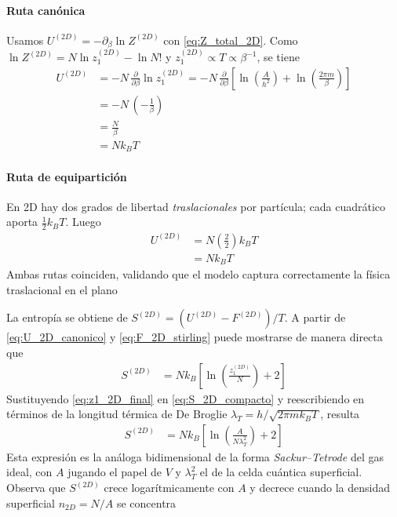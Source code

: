 \documentclass{article}
\begin{document}
\paragraph{Ruta canónica} Usamos $U^{(2D)}=-\partial_{\beta}\ln Z^{(2D)}$ con \eqref{eq:Z_total_2D}. Como $\ln Z^{(2D)}=N\ln z_1^{(2D)}-\ln N!$ y $z_1^{(2D)}\propto T\propto \beta^{-1}$, se tiene
\begin{equation}
\begin{split}
U^{(2D)}
&= -N\,\frac{\partial}{\partial \beta}\ln z_1^{(2D)}
= -N\,\frac{\partial}{\partial \beta}\left[\ln\!\left(\frac{A}{h^2}\right)+\ln\!\left(\frac{2\pi m}{\beta}\right)\right]\\
&= -N\,\left(-\frac{1}{\beta}\right)\\
&= \frac{N}{\beta}\\
&= N k_B T
\end{split}\label{eq:U_2D_canonico}
\end{equation}

\paragraph{Ruta de equipartición} En 2D hay dos grados de libertad \textit{traslacionales} por partícula; cada cuadrático aporta $\tfrac{1}{2}k_B T$. Luego
\begin{equation}
\begin{split}
U^{(2D)}
&= N\left(\frac{2}{2}\right)k_B T\\
&= N k_B T
\end{split}\label{eq:U_2D_equiparticion}
\end{equation}
Ambas rutas coinciden, validando que el modelo captura correctamente la física traslacional en el plano



La entropía se obtiene de $S^{(2D)}=(U^{(2D)}-F^{(2D)})/T$. A partir de \eqref{eq:U_2D_canonico} y \eqref{eq:F_2D_stirling} puede mostrarse de manera directa que
\begin{equation}
\begin{split}
S^{(2D)}
&= N k_B\left[\ln\!\left(\frac{z_1^{(2D)}}{N}\right)+2\right]
\end{split}\label{eq:S_2D_compacto}
\end{equation}
Sustituyendo \eqref{eq:z1_2D_final} en \eqref{eq:S_2D_compacto} y reescribiendo en términos de la longitud térmica de De Broglie $\lambda_T = h/\sqrt{2\pi m k_B T}$, resulta
\begin{equation}
\begin{split}
S^{(2D)}
&= N k_B\left[
\ln\!\left(\frac{A}{N \lambda_T^2}\right) + 2
\right]
\end{split}\label{eq:S_2D_lambda}
\end{equation}
Esta expresión es la análoga bidimensional de la forma \textit{Sackur–Tetrode} del gas ideal, con $A$ jugando el papel de $V$ y $\lambda_T^2$ el de la celda cuántica superficial. Observa que $S^{(2D)}$ crece logarítmicamente con $A$ y decrece cuando la densidad superficial $n_{2D}=N/A$ se concentra
\end{document}
